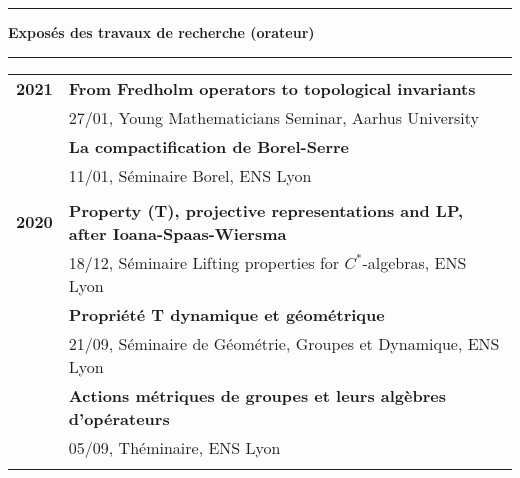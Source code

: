 \documentclass[a4paper,11pt]{article}
\newcommand{\titre}[1]{%
	\begin{center}
	\bigskip
	\rule{\textwidth}{1pt}
	\par\vspace{0.1cm}
        \textbf{\large #1}
	\par\rule{\textwidth}{1pt}
	\end{center}
	\bigskip
	}
\begin{document}
\newpage
\titre{Expos\'es des travaux de recherche (orateur)}

\begin{tabular}{cp{}}


\textbf{2021}   & \textbf{From Fredholm operators to topological invariants} \\
                & 27/01, Young Mathematicians Seminar, Aarhus University\\ %
                & \textbf{La compactification de Borel-Serre} \\
                & 11/01, Séminaire Borel, ENS Lyon \\
\\
\textbf{2020}
                & \textbf{Property (T), projective representations and LP, after Ioana-Spaas-Wiersma}\\
                & 18/12, Séminaire Lifting properties for $C^*$-algebras, ENS Lyon \\
                & \textbf{Propriété T dynamique et géométrique} \\ %
                & 21/09, Séminaire de Géométrie, Groupes et Dynamique, ENS Lyon \\
                & \textbf{Actions métriques de groupes et leurs algèbres d'opérateurs}\\  %
                & 05/09, Théminaire, ENS Lyon \\
\\


\end{tabular}
\end{document}
